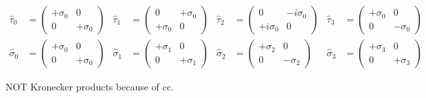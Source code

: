 \begin{align}
  \hat{\tau}_0 &= 
  \begin{pmatrix}
    +\sigma_0 & 0 \\
    0 & +\sigma_0
  \end{pmatrix}
  &
  \hat{\tau}_1 &= 
  \begin{pmatrix}
    0 & +\sigma_0 \\
    +\sigma_0 & 0 
  \end{pmatrix}
  &
  \hat{\tau}_2 &= 
  \begin{pmatrix}
    0 & -i\sigma_0 \\
    +i\sigma_0 & 0 
  \end{pmatrix}
  &
  \hat{\tau}_3 &= 
  \begin{pmatrix}
    +\sigma_0 & 0 \\
    0 & -\sigma_0
  \end{pmatrix}
  \\
  \hat{\sigma}_0 &=
  \begin{pmatrix}
    +\sigma_0 & 0 \\
    0 & +\sigma_0
  \end{pmatrix}
  &
  \hat{\sigma}_1 &=
  \begin{pmatrix}
    +\sigma_1 & 0 \\
    0 & +\sigma_1
  \end{pmatrix}
  &
  \hat{\sigma}_2 &=
  \begin{pmatrix}
    +\sigma_2 & 0 \\
    0 & -\sigma_2
  \end{pmatrix}
  &
  \hat{\sigma}_3 &=
  \begin{pmatrix}
    +\sigma_3 & 0 \\
    0 & +\sigma_3
  \end{pmatrix}
\end{align}

NOT Kronecker products because of cc.


